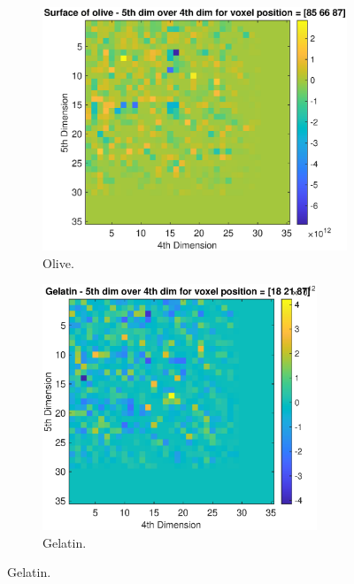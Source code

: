 \begin{figure}[H]
     \centering
     \begin{subfigure}[b]{0.69\textwidth}
         \centering
        \includegraphics[width=0.9\linewidth]{Graphics/Results/skin_pulp_stone_5D_4D_Stone.eps}
         \caption{Olive. }
         \label{fig:res:5D_4D_skin_pulp_compare_stone}
     \end{subfigure}
     \hfill
     \begin{subfigure}[b]{0.69\textwidth}
         \centering
         \includegraphics[width=0.9\textwidth]{Graphics/Results/skin_pulp_stone_5D_4D_Pulp.eps}
         \caption{Gelatin. }
         \label{fig:res:5D_4D_skin_pulp_compare_pulp}

\end{subfigure}
\end{figure}
